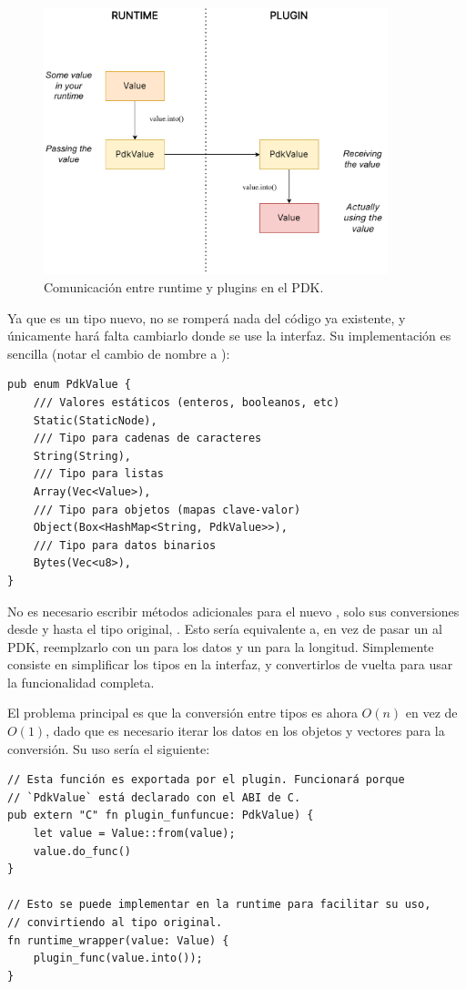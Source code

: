 \begin{figure}
    \centering
    \includegraphics[width=10cm]{./Imagenes/simplify.pdf}
    \caption{Comunicación entre runtime y plugins en el PDK.}%
    \label{fig:simplify}
\end{figure}

Ya que es un tipo nuevo, no se romperá nada del código ya existente, y
únicamente hará falta cambiarlo donde se use la interfaz. Su implementación es
sencilla (notar el cambio de nombre a ):

\begin{verbatim}
pub enum PdkValue {
    /// Valores estáticos (enteros, booleanos, etc)
    Static(StaticNode),
    /// Tipo para cadenas de caracteres
    String(String),
    /// Tipo para listas
    Array(Vec<Value>),
    /// Tipo para objetos (mapas clave-valor)
    Object(Box<HashMap<String, PdkValue>>),
    /// Tipo para datos binarios
    Bytes(Vec<u8>),
}
\end{verbatim}

No es necesario escribir métodos adicionales para el nuevo , solo
sus conversiones desde y hasta el tipo original, . Esto sería
equivalente a, en vez de pasar un  al PDK, reemplzarlo con un
 para los datos y un  para la longitud. Simplemente
consiste en simplificar los tipos en la interfaz, y convertirlos de vuelta para
usar la funcionalidad completa.

El problema principal es que la conversión entre tipos es ahora $O(n)$ en vez de
$O(1)$, dado que es necesario iterar los datos en los objetos y vectores para la
conversión. Su uso sería el siguiente:

\begin{verbatim}
// Esta función es exportada por el plugin. Funcionará porque
// `PdkValue` está declarado con el ABI de C.
pub extern "C" fn plugin_funfuncue: PdkValue) {
    let value = Value::from(value);
    value.do_func()
}

// Esto se puede implementar en la runtime para facilitar su uso,
// convirtiendo al tipo original.
fn runtime_wrapper(value: Value) {
    plugin_func(value.into());
}
\end{verbatim}

